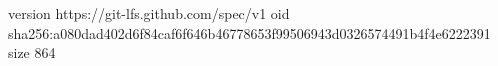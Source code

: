 version https://git-lfs.github.com/spec/v1
oid sha256:a080dad402d6f84caf6f646b46778653f99506943d0326574491b4f4e6222391
size 864
